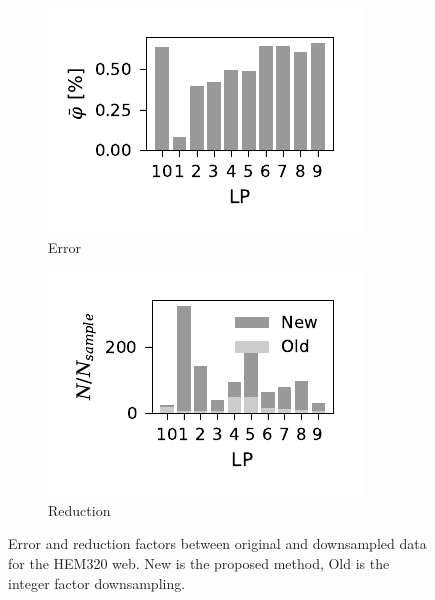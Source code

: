 \documentclass[a4paper,11pt]{article}
\begin{document}
\begin{figure}
    \centering
    \begin{subfigure}[b]{0.45\linewidth}
        \centering
        \includegraphics{error_WP3_HEM320_C_CRM20.pdf}
        \caption{Error}
        \label{fig:hem320-error}
    \end{subfigure}
    \begin{subfigure}[b]{0.45\linewidth}
        \centering
        \includegraphics{N_reduction_WP3_HEM320_C_CRM20.pdf}
        \caption{Reduction}
        \label{fig:hem320-reduction}
    \end{subfigure}
    \caption{Error and reduction factors between original and downsampled data for the HEM320 web. New is the proposed method, Old is the integer factor downsampling.}
    \label{fig:error-and-reduction}
\end{figure}
\end{document}
